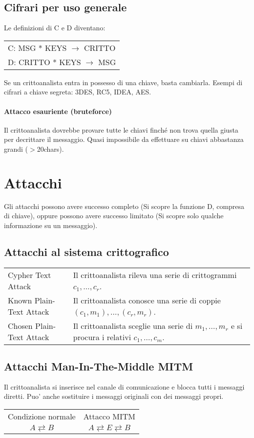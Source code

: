 \subsection{Cifrari per uso generale}
Le definizioni di C e D diventano:

\begin{tabular}{l}
    C: MSG * KEYS $\rightarrow$ CRITTO\\
    D: CRITTO * KEYS $\rightarrow$ MSG\\
\end{tabular}

Se un crittoanalista entra in possesso di una chiave, basta cambiarla.
Esempi di cifrari a chiave segreta: 3DES, RC5, IDEA, AES.

\paragraph{Attacco esauriente (bruteforce)} Il crittoanalista dovrebbe provare tutte le chiavi finché non trova quella giusta per decrittare il messaggio.
Quasi impossibile da effettuare su chiavi abbastanza grandi ($>$20chars).
\section{Attacchi}
Gli attacchi possono avere successo completo (Si scopre la funzione D, compresa di chiave), oppure possono avere successo limitato (Si scopre solo qualche informazione su un messaggio).
\subsection{Attacchi al sistema crittografico}
\begin{tabular}{l | p{17em}}
    Cypher Text Attack & Il crittoanalista rileva una serie di crittogrammi $c_1, \dots, c_r$.\\
    Known Plain-Text Attack & Il crittoanalista conosce una serie di coppie $(c_1, m_1), \dots, (c_r, m_r)$.\\
    Chosen Plain-Text Attack & Il crittoanalista sceglie una serie di $m_1, \dots, m_r$ e si procura i relativi $c_1, \dots, c_m$.
\end{tabular}
\subsection{Attacchi Man-In-The-Middle MITM}
Il crittoanalista si inserisce nel canale di comunicazione e blocca tutti i messaggi diretti.
Puo' anche sostituire i messaggi originali con dei messaggi propri.
\begin{center}
    \begin{tabular}{c | c}
        Condizione normale & Attacco MITM\\
        $A \rightleftarrows B$ & $A \rightleftarrows E \rightleftarrows B$
    \end{tabular}
\end{center}

